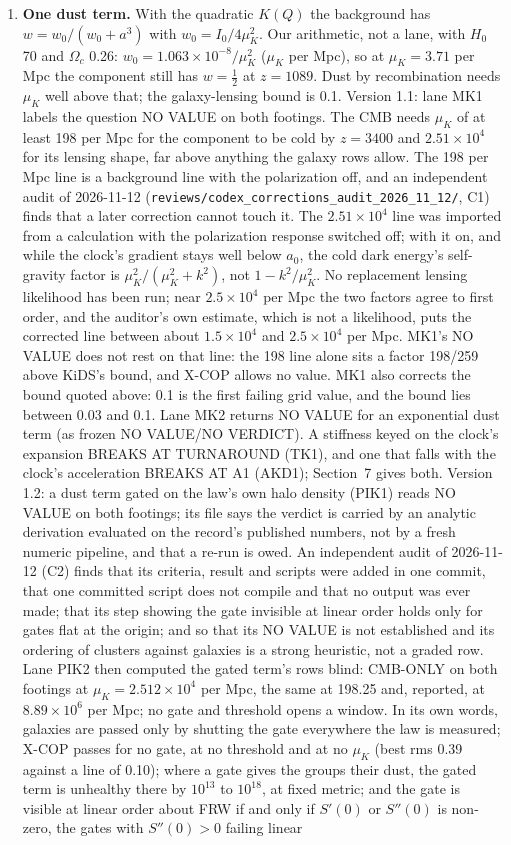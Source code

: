 \documentclass[10pt]{article}
\begin{document}
\begin{enumerate}
\item \textbf{One dust term.} With the quadratic $K(Q)$ the background has $w=w_0/(w_0+a^3)$ with $w_0=I_0/4\mu_K^2$. Our arithmetic, not a lane, with $H_0$ 70 and $\Omega_c$ 0.26: $w_0=1.063\times10^{-8}/\mu_K^2$ ($\mu_K$ per Mpc), so at $\mu_K=3.71$ per Mpc the component still has $w=\tfrac12$ at $z=1089$. Dust by recombination needs $\mu_K$ well above that; the galaxy-lensing bound is 0.1. Version 1.1: lane MK1 labels the question NO VALUE on both footings. The CMB needs $\mu_K$ of at least 198 per Mpc for the component to be cold by $z=3400$ and $2.51\times10^{4}$ for its lensing shape, far above anything the galaxy rows allow. The 198 per Mpc line is a background line with the polarization off, and an independent audit of 2026-11-12 (\texttt{reviews/codex\_corrections\_audit\_2026\_11\_12/}, C1) finds that a later correction cannot touch it. The $2.51\times10^{4}$ line was imported from a calculation with the polarization response switched off; with it on, and while the clock's gradient stays well below $a_0$, the cold dark energy's self-gravity factor is $\mu_K^2/(\mu_K^2+k^2)$, not $1-k^2/\mu_K^2$. No replacement lensing likelihood has been run; near $2.5\times10^{4}$ per Mpc the two factors agree to first order, and the auditor's own estimate, which is not a likelihood, puts the corrected line between about $1.5\times10^{4}$ and $2.5\times10^{4}$ per Mpc. MK1's NO VALUE does not rest on that line: the 198 line alone sits a factor 198/259 above KiDS's bound, and X-COP allows no value. MK1 also corrects the bound quoted above: 0.1 is the first failing grid value, and the bound lies between 0.03 and 0.1. Lane MK2 returns NO VALUE for an exponential dust term (as frozen NO VALUE/NO VERDICT). A stiffness keyed on the clock's expansion BREAKS AT TURNAROUND (TK1), and one that falls with the clock's acceleration BREAKS AT A1 (AKD1); Section~7 gives both. Version 1.2: a dust term gated on the law's own halo density (PIK1) reads NO VALUE on both footings; its file says the verdict is carried by an analytic derivation evaluated on the record's published numbers, not by a fresh numeric pipeline, and that a re-run is owed. An independent audit of 2026-11-12 (C2) finds that its criteria, result and scripts were added in one commit, that one committed script does not compile and that no output was ever made; that its step showing the gate invisible at linear order holds only for gates flat at the origin; and so that its NO VALUE is not established and its ordering of clusters against galaxies is a strong heuristic, not a graded row. Lane PIK2 then computed the gated term's rows blind: CMB-ONLY on both footings at $\mu_K=2.512\times10^{4}$ per Mpc, the same at 198.25 and, reported, at $8.89\times10^{6}$ per Mpc; no gate and threshold opens a window. In its own words, galaxies are passed only by shutting the gate everywhere the law is measured; X-COP passes for no gate, at no threshold and at no $\mu_K$ (best rms 0.39 against a line of 0.10); where a gate gives the groups their dust, the gated term is unhealthy there by $10^{13}$ to $10^{18}$, at fixed metric; and the gate is visible at linear order about FRW if and only if $S'(0)$ or $S''(0)$ is non-zero, the gates with $S''(0)>0$ failing linear 
\end{enumerate}
\end{document}
